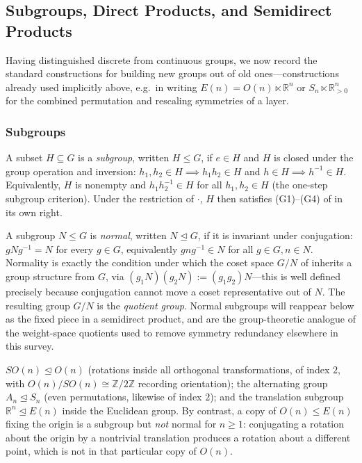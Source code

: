 \documentclass[mathematics,review,submit,moreauthors]{Definitions/mdpi}
\begin{document}

\subsection{Subgroups, Direct Products, and Semidirect Products}
\label{subsec:subgroups-products}

Having distinguished discrete from continuous groups, we now record the
standard constructions for building new groups out of old ones---constructions
already used implicitly above, e.g.\ in writing $E(n) = O(n) \ltimes
\mathbb{R}^n$ or $S_n \ltimes \mathbb{R}_{>0}^n$ for the combined permutation
and rescaling symmetries of a layer.

\subsubsection{Subgroups}
\label{subsubsec:subgroups}

\begin{Definition}
\label{def:subgroup}
A subset $H \subseteq G$ is a \emph{subgroup}, written $H \leq G$, if
$e \in H$ and $H$ is closed under the group operation and inversion:
$h_1, h_2 \in H \implies h_1 h_2 \in H$ and $h \in H \implies h^{-1} \in H$.
Equivalently, $H$ is nonempty and $h_1 h_2^{-1} \in H$ for all
$h_1, h_2 \in H$ (the one-step subgroup criterion). Under the restriction of
$\cdot$, $H$ then satisfies (G1)--(G4) of  in its
own right.
\end{Definition}

A subgroup $N \leq G$ is \emph{normal}, written $N \trianglelefteq G$, if it
is invariant under conjugation: $g N g^{-1} = N$ for every $g \in G$,
equivalently $g n g^{-1} \in N$ for all $g \in G, n \in N$. Normality is
exactly the condition under which the coset space $G/N$ of
 inherits a group structure from $G$, via
$(g_1 N)(g_2 N) := (g_1 g_2) N$---this is well defined precisely because
conjugation cannot move a coset representative out of $N$. The resulting
group $G/N$ is the \emph{quotient group}. Normal subgroups will reappear
below as the fixed piece in a semidirect product, and are the group-theoretic
analogue of the weight-space quotients used to remove symmetry redundancy
elsewhere in this survey.

\begin{Example}
\label{ex:subgroups}
$SO(n) \trianglelefteq O(n)$ (rotations inside all orthogonal
transformations, of index $2$, with $O(n)/SO(n) \cong \mathbb{Z}/2\mathbb{Z}$
recording orientation); the alternating group
$A_n \trianglelefteq S_n$ (even permutations, likewise of index $2$); and the
translation subgroup $\mathbb{R}^n \trianglelefteq E(n)$ inside the Euclidean
group. By contrast, a copy of $O(n) \leq E(n)$ fixing the origin is a
subgroup but \emph{not} normal for $n \geq 1$: conjugating a rotation about
the origin by a nontrivial translation produces a rotation about a different
point, which is not in that particular copy of $O(n)$.
\end{Example}
\end{document}
